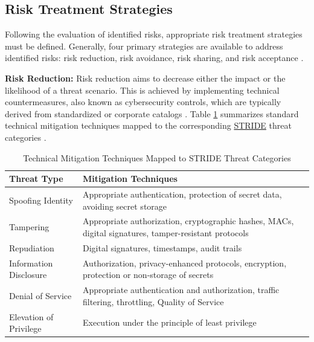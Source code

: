 \subsection{Risk Treatment Strategies} 
\label{subsec:risk_treatment_strategies} 

Following the evaluation of identified risks, appropriate risk treatment strategies must be defined. Generally, four primary strategies are available to address identified risks: risk reduction, risk avoidance, risk sharing, and risk acceptance \cite[pp. 200]{doCarmo2025}.

\textbf{Risk Reduction:} Risk reduction aims to decrease either the impact or the likelihood of a threat scenario. This is achieved by implementing technical countermeasures, also known as cybersecurity controls, which are typically derived from standardized or corporate catalogs \cite[p. 200]{doCarmo2025}. Table \ref{tab:stride_mitigations} summarizes standard technical mitigation techniques mapped to the corresponding \hyperref[subsec:stride]{STRIDE} threat categories \cite{owasp_threat_modeling_process}.

\begin{table}[htbp]
	\caption{Technical Mitigation Techniques Mapped to STRIDE Threat Categories \cite{owasp_threat_modeling_process}}
	\label{tab:stride_mitigations}
	\centering
	\begin{tabularx}{\textwidth}{l X}
		\toprule
		\textbf{Threat Type} & \textbf{Mitigation Techniques} \\
		\midrule
		Spoofing Identity & Appropriate authentication, protection of secret data, avoiding secret storage \\ \addlinespace
		Tampering & Appropriate authorization, cryptographic hashes, MACs, digital signatures, tamper-resistant protocols \\ \addlinespace
		Repudiation & Digital signatures, timestamps, audit trails \\ \addlinespace
		Information Disclosure & Authorization, privacy-enhanced protocols, encryption, protection or non-storage of secrets \\ \addlinespace
		Denial of Service & Appropriate authentication and authorization, traffic filtering, throttling, Quality of Service \\ \addlinespace
		Elevation of Privilege & Execution under the principle of least privilege \\
		\bottomrule
	\end{tabularx}
\end{table}
		
